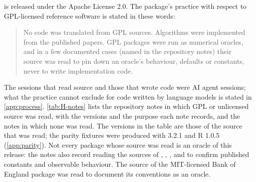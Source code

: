  is released under the Apache License 2.0.
The package's practice with respect to GPL-licensed reference software is stated in these words:
\begin{quote}
No code was translated from GPL sources. Algorithms were implemented from the published papers. GPL
packages were run as numerical oracles, and in a few documented cases (named in the repository
notes) their source was read to pin down an oracle's behaviour, defaults or constants, never to write
implementation code.
\end{quote}
The sessions that read source and those that wrote code were AI agent sessions; what the practice
cannot exclude for code written by language models is stated in \cref{app:process}.
\cref{tab:H-notes} lists the repository notes in which GPL or unlicensed source was read, with
the versions and the purpose each note records, and the notes in which none was read.
The versions in the table are those of the source that was read; the parity fixtures were produced
with  3.2.1 and R  1.0.5 (\cref{app:parity}).
Not every package whose source was read is an oracle of this release: the notes also record
reading the sources of , , , 
and  to confirm published constants and observable behaviour.
The source of the MIT-licensed Bank of England package was read to document its conventions as
an oracle. %

